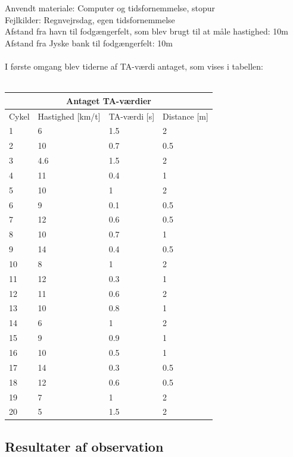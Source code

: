 Anvendt materiale: Computer og tidsfornemmelse, stopur
\\
Fejlkilder: Regnvejrsdag, egen tidsfornemmelse
\\
Afstand fra havn til fodgængerfelt, som blev brugt til at måle hastighed: 10m
\\
Afstand fra Jyske bank til fodgængerfelt: 10m
\\\\
I første omgang blev tiderne af TA-værdi antaget, som vises i tabellen:
\\\\
\begin{tabular}{ |p{1cm}|p{4cm}|p{4cm}|p{4cm}|  }
\hline
\multicolumn{4}{|c|}{Antaget TA-værdier} \\
\hline
Cykel & Hastighed [km/t] & TA-værdi [s] & Distance [m] \\
\hline
1 & 6   & 1.5 & 2 \\
2 & 10  & 0.7 & 0.5 \\
3 & 4.6 & 1.5 & 2 \\
4 & 11  & 0.4 & 1 \\
5 & 10  & 1 & 2 \\
6 & 9   & 0.1 & 0.5 \\
7 & 12  & 0.6 & 0.5 \\
8 & 10  & 0.7 & 1 \\
9 & 14  & 0.4 & 0.5 \\
10 & 8  & 1   & 2 \\
11 & 12 &0.3  &  1 \\
12 & 11 & 0.6 &   2\\
13 & 10 & 0.8 & 1\\
14 & 6  & 1   & 2\\
15 & 9  & 0.9 & 1\\
16 & 10 & 0.5 & 1\\
17 & 14 & 0.3 &0.5\\
18 & 12 & 0.6 & 0.5\\
19 & 7  & 1 & 2\\
20 & 5  & 1.5 & 2\\
\hline
\end{tabular}




\subsection{Resultater af observation}
\label{sub:def_konflikt}


